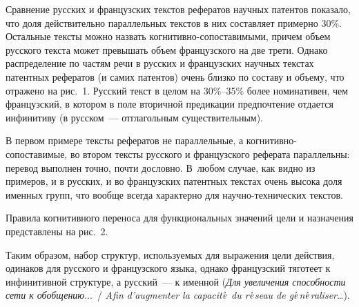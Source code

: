 \begin{multicols}{2}
     Сравнение русских и французских текстов рефератов научных 
патентов показало, что доля дей\-ст\-ви\-тель\-но параллельных текстов в них 
составляет примерно 30\%. Остальные тексты можно \mbox{назвать}\linebreak 
     ког\-ни\-тив\-но-со\-по\-ста\-ви\-мы\-ми, причем объем русского текста 
может превышать объем французского на две трети. Однако распределение 
по частям речи в русских и французских научных текстах патентных 
рефератов (и самих патентов) очень близко по составу и объему, что 
отражено на рис.~1. Русский текст в целом на 30\%--35\% более 
номинативен, чем французский, в котором в поле вторичной предикации 
предпочтение отдается инфинитиву (в русском~--- отглагольным 
существительным).
     
     В первом примере тексты рефератов не параллельные, а 
     когни\-тив\-но-со\-по\-ста\-ви\-мые, во втором тексты русского и 
французского реферата параллельны: перевод выполнен точно, почти 
дословно. В~любом случае, как видно из примеров, и в русских, и во 
французских патентных текстах очень высока доля именных групп, что 
вообще всегда характерно для на\-уч\-но-тех\-ни\-че\-ских текстов.
     
     Правила когнитивного переноса для функциональных значений цели и 
назначения представлены на рис.~2.
     

     Таким образом, набор структур, используемых для выражения цели 
действия, одинаков для русского и французского языка, однако французский 
тяготеет к инфинитивной структуре, а русский~--- к именной (\textit{Для 
увеличения способности сети к обобщению}$\ldots$~/ \textit{Afin d'augmenter 
la capacit$\acute{\mbox{\textit{e}}}$ du r$\acute{\mbox{\textit{e}}}$seau de 
g$\acute{\mbox{\textit{e}}}$n$\acute{\mbox{\textit{e}}}$raliser}\ldots).
     
     \smallskip
     

\end{multicols}
